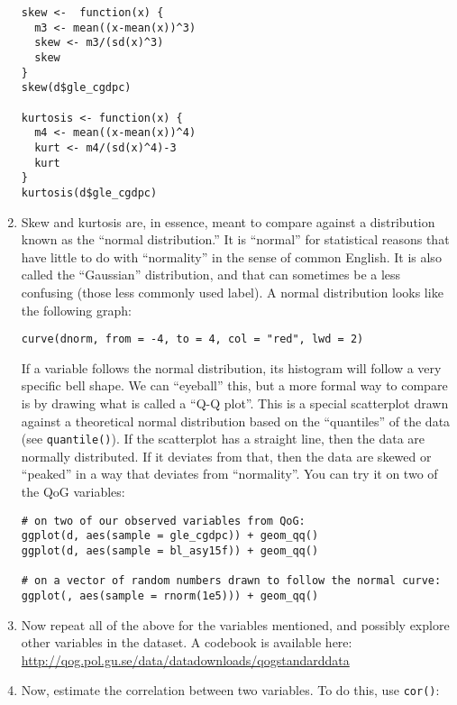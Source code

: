 \documentclass[a4paper,12pt]{article}
\begin{document}
\begin{enumerate}
\begin{verbatim}
skew <-  function(x) {
  m3 <- mean((x-mean(x))^3)
  skew <- m3/(sd(x)^3)
  skew
}
skew(d$gle_cgdpc)

kurtosis <- function(x) {  
  m4 <- mean((x-mean(x))^4) 
  kurt <- m4/(sd(x)^4)-3  
  kurt
}
kurtosis(d$gle_cgdpc)
\end{verbatim}

\item Skew and kurtosis are, in essence, meant to compare against a distribution known as the ``normal distribution.'' It is ``normal'' for statistical reasons that have little to do with ``normality'' in the sense of common English. It is also called the ``Gaussian'' distribution, and that can sometimes be a less confusing (those less commonly used label). A normal distribution looks like the following graph:

\begin{verbatim}
curve(dnorm, from = -4, to = 4, col = "red", lwd = 2)
\end{verbatim}


If a variable follows the normal distribution, its histogram will follow a very specific bell shape. We can ``eyeball'' this, but a more formal way to compare is by drawing what is called a ``Q-Q plot''. This is a special scatterplot drawn against a theoretical normal distribution based on the ``quantiles'' of the data (see \texttt{quantile()}). If the scatterplot has a straight line, then the data are normally distributed. If it deviates from that, then the data are skewed or ``peaked'' in a way that deviates from ``normality''. You can try it on two of the QoG variables:

\begin{verbatim}
# on two of our observed variables from QoG:
ggplot(d, aes(sample = gle_cgdpc)) + geom_qq()
ggplot(d, aes(sample = bl_asy15f)) + geom_qq()

# on a vector of random numbers drawn to follow the normal curve:
ggplot(, aes(sample = rnorm(1e5))) + geom_qq()
\end{verbatim}

\item Now repeat all of the above for the variables mentioned, and possibly explore other variables in the dataset. A codebook is available here: \url{http://qog.pol.gu.se/data/datadownloads/qogstandarddata}

\item Now, estimate the correlation between two variables. To do this, use \texttt{cor()}:


\end{enumerate}
\end{document}
